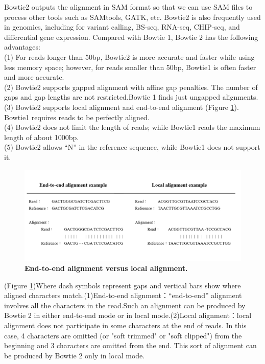 \documentclass{PHlab-thesis}
\begin{document}
Bowtie2 outputs the alignment in SAM format so that we can use SAM files to process other tools such as SAMtools, GATK, etc.  Bowtie2 is also frequently used in genomics, including for variant calling, BS-seq, RNA-seq, CHIP-seq, and differential gene expression. Compared with Bowtie 1, Bowtie 2 has the following advantages:\\
(1) For reads longer than 50bp, Bowtie2 is more accurate and faster while using less memory space; however, for reads smaller than 50bp, Bowtie1 is often faster and more accurate.\\
(2) Bowtie2 supports gapped alignment with affine gap penalties. The number of gaps and gap lengths are not restricted.Bowtie 1 finds just ungapped alignments.\\
(3) Bowtie2 supports local alignment and end-to-end alignment (Figure \ref{f5}). Bowtie1 requires reads to be perfectly aligned.\\
(4) Bowtie2 does not limit the length of reads; while Bowtie1 reads the maximum length of about 1000bp.\\
(5) Bowtie2 allows “N” in the reference sequence, while Bowtie1 does not support it.\\

\begin{figure}[h]
  \centering
  \includegraphics[scale=0.8]{figures/bowtie2_align.png}
  \caption{\textbf{End-to-end alignment versus local alignment.}
  }
  \label{f5}
\end{figure}

(Figure \ref{f5})Where dash symbols represent gaps and vertical bars show where aligned characters match.(1)End-to-end alignment：“end-to-end” alignment involves all the characters in the read.Such an alignment can be produced by Bowtie 2 in either end-to-end mode or in local mode.(2)Local alignment：local alignment does not participate in some characters at the end of reads. In this case, 4 characters are omitted (or "soft trimmed" or "soft clipped") from the beginning and 3 characters are omitted from the end. This sort of alignment can be produced by Bowtie 2 only in local mode.
\end{document}
